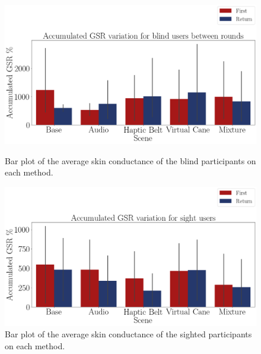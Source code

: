 \begin{figure}[!htb]
    \centering
    \begin{minipage}{\textwidth}
        \centering
        \includegraphics[width = 0.8\linewidth]{Resultados/GSR/Figuras/png/barplot_gsr_sum_scene_blind.png}
        \caption{Bar plot of the average skin conductance of the blind participants on each method.}
        \label{fig:barplot_gsr_scene_blind}
    \end{minipage}
    \begin{minipage}{\textwidth}
        \centering
        \includegraphics[width = 0.8\linewidth]{Resultados/GSR/Figuras/png/barplot_gsr_sum_scene_sight.png}
        \caption{Bar plot of the average skin conductance of the sighted participants on each method.}
        \label{fig:barplot_gsr_scene_sight}
    \end{minipage}
\end{figure}


